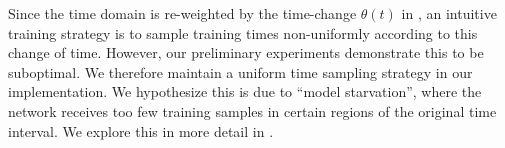 Since the time domain is re-weighted by the time-change \(\theta(t)\) in , an intuitive training strategy is to sample training times non-uniformly according to this change of time. However, our preliminary experiments demonstrate this to be suboptimal.  We therefore maintain a uniform time sampling strategy in our implementation. We hypothesize this is due to ``model starvation'', where the network receives too few training samples in certain regions of the original time interval. We explore this in more detail in .



